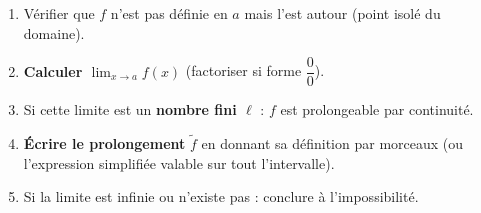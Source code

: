 \documentclass[11pt]{article}
\begin{document}
\begin{methode}
\begin{enumerate}
\item Vérifier que $f$ n'est pas définie en $a$ mais l'est autour (point isolé du domaine).
\item \textbf{Calculer $\lim_{x\to a} f(x)$} (factoriser si forme $\dfrac{0}{0}$).
\item Si cette limite est un \textbf{nombre fini $\ell$} : $f$ est prolongeable par continuité.
\item \textbf{Écrire le prolongement} $\tilde{f}$ en donnant sa définition par morceaux (ou l'expression simplifiée valable sur tout l'intervalle).
\item Si la limite est infinie ou n'existe pas : conclure à l'impossibilité.
\end{enumerate}
\end{methode}
\end{document}
